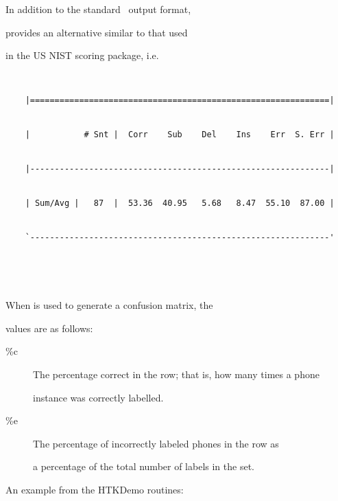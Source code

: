 In addition to the standard \HTK\ output format, 


 provides an alternative similar to that used


in the US NIST scoring package, i.e.\


\begin{verbatim}


    |=============================================================|


    |           # Snt |  Corr    Sub    Del    Ins    Err  S. Err |


    |-------------------------------------------------------------|


    | Sum/Avg |   87  |  53.36  40.95   5.68   8.47  55.10  87.00 |


    `-------------------------------------------------------------'





\end{verbatim}








When  is used to generate a confusion matrix, the


values are as follows:


\begin{description}


\item[\%c] The percentage correct in the row; that is, how many times a phone


     instance was correctly labelled.


\item[\%e] The percentage of incorrectly labeled phones in the row as


     a percentage of the total number of labels in the set.


\end{description}


An example from the HTKDemo routines:



